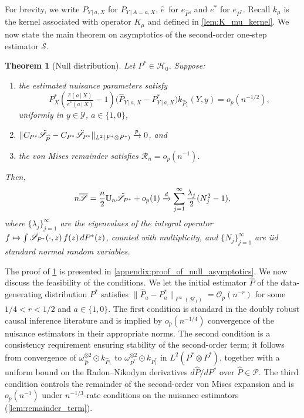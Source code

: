 \documentclass{article}
\theoremstyle{plain}
\newtheorem{theorem}{Theorem}[section]
\theoremstyle{definition}
\theoremstyle{remark}
\newcommand{\U}{\mathbb{U}}
\newcommand{\of}[1]{\left(#1\right)}
\newcommand{\cH}{\mathcal{H}}
\newcommand{\cO}{\mathcal{O}}
\newcommand{\cY}{\mathcal{Y}}
\newcommand{\ucH}{\mathscr{H}}
\newcommand{\ucR}{\mathscr{R}}
\newcommand{\hP}{\widehat{P}}
\newcommand{\1}{\mathbbm{1}}
\newcommand{\STE}{\mathscr{S}}
\theoremstyle{plain}
\theoremstyle{definition}
\newcommand{\mymid}{\,|\,}
\begin{document}
For brevity, we write $P_{Y \mymid a, X}$ for $P_{Y \mymid A=a, X}$, $\hat{e}\,$ for $e_{\hP}$, and $e^*$ for $e_{P^*}$. Recall $k_{\mu}$ is the kernel associated with operator $K_\mu$ and defined in \cref{lem:K_mu_kernel}. We now state the main theorem on asymptotics of the second-order one-step estimator $\overline{\STE}$. 
\begin{theorem}[Null distribution]\label{thm:null_asymptotics}
Let $P^* \in \ucH_0$. Suppose:
\begin{enumerate}
    \item the estimated nuisance parameters satisfy 
    \[
    P^*_{X} \of{\tfrac{\hat{e}(a \mymid X)}{e^*(a \mymid X)} - 1} \big({\hP_{Y \mymid a, X} - P^*_{Y \mymid a, X}}\big) k_{\hP_1}(Y, y) = o_p(n^{-1/2}),
    \]
    uniformly in $y \in \cY$, $a \in \{1,0\}$,
    \item $\|C_{P^*} \Ddot{\STE}_{\hP} - C_{P^*}\Ddot{\STE}_{P^*}\|_{L^2(P^* \otimes P^*)} \xrightarrow[]{p} 0$, and
    \item the von Mises remainder satisfies $\ucR_n = o_p(n^{-1})$.
\end{enumerate}
Then, 
\begin{equation}\label{eq:second_order_asymptotics}
    n \overline{\STE} = \frac{n}{2} \U_n \Ddot{\STE}_{P^*} + o_p(1) \xrightarrow[]{d} \sum_{j=1}^\infty \frac{\lambda_j}{2}(N_j^2 - 1),
\end{equation}    
where $\{\lambda_j\}_{j=1}^\infty$ are the eigenvalues of the integral operator $f \mapsto \int \Ddot{\STE}_{P^*}(\cdot, z) \, f(z) \, dP^*(z)$, counted with multiplicity, and $\{N_j\}_{j=1}^\infty$ are iid standard normal random variables. 
\end{theorem}
The proof of \cref{thm:null_asymptotics} is presented in \cref{appendix:proof_of_null_asymptotics}.
 We now discuss the feasibility of the conditions. We let the initial estimator $\hP$ of the data-generating distribution $P^*$ satisfies $\|\hP_a - P^*_a\|_{\ell^\infty(\cH_1)} = \cO_p(n^{-r})$ for some $1/4 < r < 1/2$ and $a \in \{1,0\}$. 
 The first condition is standard in the doubly robust causal inference literature \cite{luedtke2024one} and is implied by $o_p(n^{-1/4})$ convergence of the nuisance estimators in their appropriate norms. The second condition is a consistency requirement ensuring stability of the second-order term; it follows from convergence of $\omega_{\hP}^{\otimes 2} \odot k_{\hP_1}$ to $\omega_{P^*}^{\otimes 2} \odot k_{P^*_1}$ in $L^2(P^* \otimes P^*)$, together with a uniform bound on the Radon–Nikodym derivatives $d\hP / dP^*$ over $\hP \in \mathcal P$. The third condition controls the remainder of the second-order von Mises expansion and is $o_p(n^{-1})$ under $n^{-1/3}$-rate conditions on the nuisance estimators (\cref{lem:remainder_term}).
\end{document}
